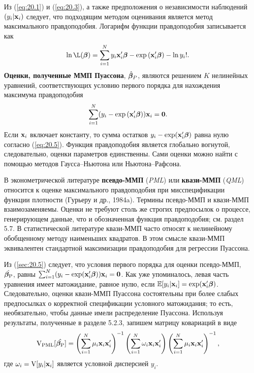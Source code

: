 Из (\ref{eq:20.1}) и (\ref{eq:20.3}), а также предположения о независимости наблюдений $(y_i|\mathbf{x}_i)$ следует, что подходящим методом оценивания является метод максимального правдоподобия. Логарифм функции правдоподобия записывается как
    \begin{align}\label{eq:20.4}
    \ln \L(\be) = \sum^{N}_{i=1} {y_i\xib - \exp{(\xib) - \ln y_i !}}.
    \end{align}
\textbf{Оценки, полученные ММП Пуассона}, $\hat{\bm{\beta}}_P$, являются решением $K$ нелинейных уравнений, соответствующих условию первого порядка для нахождения максимума правдоподобия
    \begin{align}\label{eq:20.5}
    \sum^{N}_{i=1} (y_i - \exp{(\mathbf{x}_i'\bm{\beta})})\mathbf{x}_i = \textbf{0}.
    \end{align}
Если $\mathbf{x}_i$ включает константу, то сумма остатков $y_i - \exp(\mathbf{x}_i'\bm{\beta})$ равна нулю согласно (\ref{eq:20.5}). Функция правдоподобия является глобально вогнутой, следовательно, оценки параметров единственны. Сами оценки можно найти с помощью методов Гаусса--Ньютона или Ньютона--Рафсона.

В эконометрической литературе \textbf{псевдо-ММП} (\textit{PML}) или \textbf{квази-ММП} (\textit{QML}) относится к оценке максимального правдоподобия при мисспецификации функции плотности (Гурьеру и др., 1984a). Термины псевдо-ММП и квази-ММП взаимозаменяемы. Оценки не требуют столь же строгих предпосылок о процессе, генерирующем данные, что и обозначенная функция правдоподобия; см. раздел 5.7. %
В статистической литературе квази-ММП часто относят к нелинейному обобщенному методу наименьших квадратов. В этом смысле квази-ММП эквивалентен стандартной максимизации правдоподобия для регрессии Пуассона.

Из (\ref{sec:20.5}) следует, что условия первого порядка для оценки псевдо-ММП, $\hat{\bm{\beta}_{\mathrm{P}}}$, равны $\sum^{N}_{i = 1} (y_i - \exp(\mathbf{x}_i'\bm{\beta}))\mathbf{x}_i = \mathbf{0}$. Как уже упоминалось, левая часть уравнения имеет матожидание, равное нулю, если $\mathbb{E}[y_i|\mathbf{x}_i] = \exp(\mathbf{x}_i'\bm{\beta})$. Следовательно, оценки квази-ММП Пуассона состоятельны при более слабых предпосылках о корректной спецификации условного матожидания; то есть, необязательно, чтобы данные имели распределение Пуассона. Используя результаты, полученные в разделе 5.2.3, %
запишем матрицу ковариаций в виде
    \begin{align}\label{eq:20.6}
    \mathrm{V}_{\mathrm{PML}}[\hat{\bm{\beta}_{\mathrm{P}}}] = \left( \sum^{N}_{i = 1} \mu_i \mathbf{x}_i\mathbf{x}'_i \right)^{-1} \left( \sum^{N}_{i = 1} \omega_i \mathbf{x}_i\mathbf{x}'_i \right) \left( \sum^{N}_{i = 1} \mu_i \mathbf{x}_i\mathbf{x}'_i \right)^{-1},
    \end{align}
где $\omega_i = \mathrm{V}[y_i|\mathbf{x}_i]$ является условной дисперсией $y_i$.

